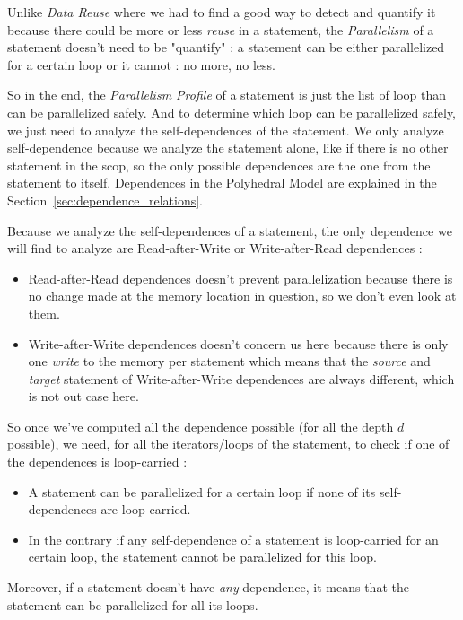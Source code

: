 \documentclass[paper=a4, fontsize=11.5pt]{scrartcl}
\numberwithin{equation}{section}        %
\numberwithin{figure}{section}          %
\numberwithin{table}{section}               %
\begin{document}
        Unlike \textit{Data Reuse} where we had to find a good way to detect and quantify it
        because there could be more or less \textit{reuse} in a statement, the \textit{Parallelism}
        of a statement doesn't need to be "quantify" : a statement can be either parallelized
        for a certain loop or it cannot : no more, no less.

        So in the end, the \textit{Parallelism Profile} of a statement is just the list
        of loop than can be parallelized safely. And to determine which loop can be parallelized
        safely, we just need to analyze the \glspl{self-dependence} of the statement.
        We only analyze \gls{self-dependence} because we analyze the statement alone, 
        like if there is no other statement in the scop, so the only possible dependences
        are the one from the statement to itself.
        Dependences in the Polyhedral Model are explained in the Section~\ref{sec:dependence_relations}.
       
        \bigskip

        Because we analyze the \glspl{self-dependence} of a statement, the only
        dependence we will find to analyze are Read-after-Write or Write-after-Read dependences :
        \begin{itemize}
            \item Read-after-Read dependences doesn't prevent parallelization because there is no
                change made at the memory location in question, so we don't even look at them.
        
            \item Write-after-Write dependences doesn't concern us here because there is
                only one \textit{write} to the memory per statement which means that
                the \textit{source} and \textit{target} statement of Write-after-Write
                dependences are always different, which is not out case here.
        \end{itemize}
        
        So once we've computed all the dependence possible (for all the depth $d$ possible),
        we need, for all the iterators/loops of the statement, to check if one of the dependences
        is loop-carried :
        \begin{itemize}
            \item A statement can be parallelized for a certain loop if none of its \glspl{self-dependence}
                are loop-carried.
            \item In the contrary if any \gls{self-dependence} of a statement is loop-carried for an certain loop,
                the statement cannot be parallelized for this loop.
        \end{itemize}
        Moreover, if a statement doesn't have \textit{any} dependence, it means that the
        statement can be parallelized for all its loops.
\end{document}
